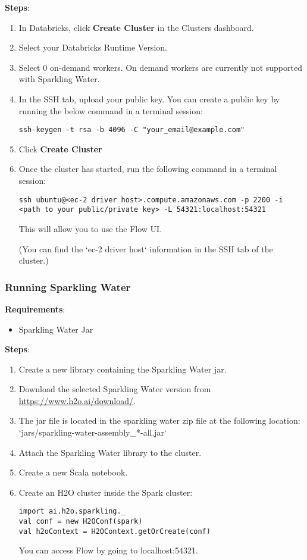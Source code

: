 \textbf{Steps}:
\begin{enumerate}
\item In Databricks, click \textbf{Create Cluster} in the Clusters dashboard.
\item Select your Databricks Runtime Version.
\item Select 0 on-demand workers. On demand workers are currently not supported with Sparkling Water.
\item In the SSH tab, upload your public key.  You can create a public key by running the below command in a terminal session:
\begin{lstlisting}[style=Bash]
ssh-keygen -t rsa -b 4096 -C "your_email@example.com"
\end{lstlisting}
\item Click \textbf{Create Cluster}
\item Once the cluster has started, run the following command in a terminal session:
\begin{lstlisting}[style=Bash]
ssh ubuntu@<ec-2 driver host>.compute.amazonaws.com -p 2200 -i <path to your public/private key> -L 54321:localhost:54321
\end{lstlisting}
This will allow you to use the Flow UI.

(You can find the `ec-2 driver host` information in the SSH tab of the cluster.)

\end{enumerate}

\subsubsection{Running Sparkling Water}

\textbf{Requirements}:
\begin{itemize}
\item Sparkling Water Jar
\end{itemize}

\textbf{Steps}:
\begin{enumerate}
\item Create a new library containing the Sparkling Water jar.
\item Download the selected Sparkling Water version from \url{https://www.h2o.ai/download/}.
\item The jar file is located in the sparkling water zip file at the following location: `jars/sparkling-water-assembly\_*-all.jar`
\item Attach the Sparkling Water library to the cluster.
\item Create a new Scala notebook.
\item Create an H2O cluster inside the Spark cluster:
\begin{lstlisting}[style=Scala]
import ai.h2o.sparkling._
val conf = new H2OConf(spark)
val h2oContext = H2OContext.getOrCreate(conf)
\end{lstlisting}
You can access Flow by going to localhost:54321.
\end{enumerate}

